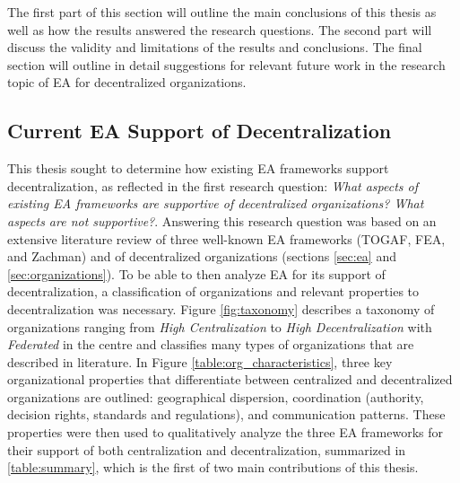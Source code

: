 The first part of this section will outline the main conclusions of this thesis as well as how the results answered the research questions. The second part will discuss the validity and limitations of the results and conclusions. The final section will outline in detail suggestions for relevant future work in the research topic of EA for decentralized organizations. 








\subsection{Current EA Support of Decentralization}

This thesis sought to determine how existing EA frameworks support decentralization, as reflected in the first research question: \textit{What aspects of existing EA frameworks are supportive of decentralized organizations? What aspects are not supportive?}. Answering this research question was based on an extensive literature review of three well-known EA frameworks (TOGAF, FEA, and Zachman) and of decentralized organizations (sections \ref{sec:ea} and \ref{sec:organizations}). To be able to then analyze EA for its support of decentralization, a classification of organizations and relevant properties to decentralization was necessary. Figure \ref{fig:taxonomy} describes a taxonomy of organizations ranging from \textit{High Centralization} to \textit{High Decentralization} with \textit{Federated} in the centre and classifies many types of organizations that are described in literature. In Figure \ref{table:org_characteristics}, three key organizational properties that differentiate between centralized and decentralized organizations are outlined: geographical dispersion, coordination (authority, decision rights, standards and regulations), and communication patterns. These properties were then used to qualitatively analyze the three EA frameworks for their support of both centralization and decentralization, summarized in \ref{table:summary}, which is the first of two main contributions of this thesis.

